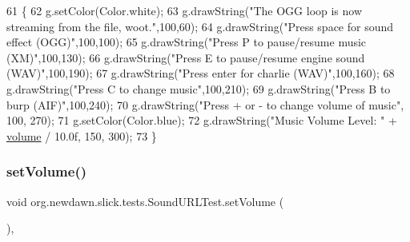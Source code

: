 \begin{DoxyCode}
61                                                             \{
62         g.setColor(Color.white);
63         g.drawString(\textcolor{stringliteral}{"The OGG loop is now streaming from the file, woot."},100,60);
64         g.drawString(\textcolor{stringliteral}{"Press space for sound effect (OGG)"},100,100);
65         g.drawString(\textcolor{stringliteral}{"Press P to pause/resume music (XM)"},100,130);
66         g.drawString(\textcolor{stringliteral}{"Press E to pause/resume engine sound (WAV)"},100,190);
67         g.drawString(\textcolor{stringliteral}{"Press enter for charlie (WAV)"},100,160);
68         g.drawString(\textcolor{stringliteral}{"Press C to change music"},100,210);
69         g.drawString(\textcolor{stringliteral}{"Press B to burp (AIF)"},100,240);
70         g.drawString(\textcolor{stringliteral}{"Press + or - to change volume of music"}, 100, 270);
71         g.setColor(Color.blue);
72         g.drawString(\textcolor{stringliteral}{"Music Volume Level: "} + \mbox{\hyperlink{classorg_1_1newdawn_1_1slick_1_1tests_1_1_sound_u_r_l_test_ac1ddaaa87f02c72f643d03cf7a6014db}{volume}} / 10.0f, 150, 300);
73     \}
\end{DoxyCode}
\mbox{\label{classorg_1_1newdawn_1_1slick_1_1tests_1_1_sound_u_r_l_test_aed79b291956c094f92082480bd818df7}} 
\subsubsection{\texorpdfstring{set\+Volume()}{setVolume()}}
{\footnotesize\ttfamily void org.\+newdawn.\+slick.\+tests.\+Sound\+U\+R\+L\+Test.\+set\+Volume (\begin{DoxyParamCaption}{ }\end{DoxyParamCaption})\hspace{0.3cm}{\ttfamily [inline]}, {\ttfamily [private]}}

